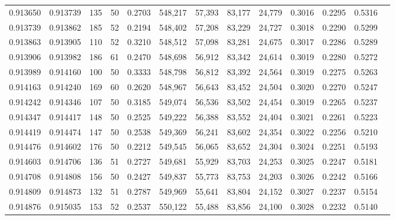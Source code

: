 \begin{tabular}{rrrrrrrrrrrrr}
0.913650 & 0.913739 &   135 &  50 &                                     0.2703 & 548,217 &  57,393 &  83,177 &  24,779 & 0.3016 & 0.2295 & 0.5316 \\
0.913739 & 0.913862 &   185 &  52 &                                     0.2194 & 548,402 &  57,208 &  83,229 &  24,727 & 0.3018 & 0.2290 & 0.5299 \\
0.913863 & 0.913905 &   110 &  52 &                                     0.3210 & 548,512 &  57,098 &  83,281 &  24,675 & 0.3017 & 0.2286 & 0.5289 \\
0.913906 & 0.913982 &   186 &  61 &                                     0.2470 & 548,698 &  56,912 &  83,342 &  24,614 & 0.3019 & 0.2280 & 0.5272 \\
0.913989 & 0.914160 &   100 &  50 &                                     0.3333 & 548,798 &  56,812 &  83,392 &  24,564 & 0.3019 & 0.2275 & 0.5263 \\
0.914163 & 0.914240 &   169 &  60 &                                     0.2620 & 548,967 &  56,643 &  83,452 &  24,504 & 0.3020 & 0.2270 & 0.5247 \\
0.914242 & 0.914346 &   107 &  50 &                                     0.3185 & 549,074 &  56,536 &  83,502 &  24,454 & 0.3019 & 0.2265 & 0.5237 \\
0.914347 & 0.914417 &   148 &  50 &                                     0.2525 & 549,222 &  56,388 &  83,552 &  24,404 & 0.3021 & 0.2261 & 0.5223 \\
0.914419 & 0.914474 &   147 &  50 &                                     0.2538 & 549,369 &  56,241 &  83,602 &  24,354 & 0.3022 & 0.2256 & 0.5210 \\
0.914476 & 0.914602 &   176 &  50 &                                     0.2212 & 549,545 &  56,065 &  83,652 &  24,304 & 0.3024 & 0.2251 & 0.5193 \\
0.914603 & 0.914706 &   136 &  51 &                                     0.2727 & 549,681 &  55,929 &  83,703 &  24,253 & 0.3025 & 0.2247 & 0.5181 \\
0.914708 & 0.914808 &   156 &  50 &                                     0.2427 & 549,837 &  55,773 &  83,753 &  24,203 & 0.3026 & 0.2242 & 0.5166 \\
0.914809 & 0.914873 &   132 &  51 &                                     0.2787 & 549,969 &  55,641 &  83,804 &  24,152 & 0.3027 & 0.2237 & 0.5154 \\
0.914876 & 0.915035 &   153 &  52 &                                     0.2537 & 550,122 &  55,488 &  83,856 &  24,100 & 0.3028 & 0.2232 & 0.5140 \\

\end{tabular}
